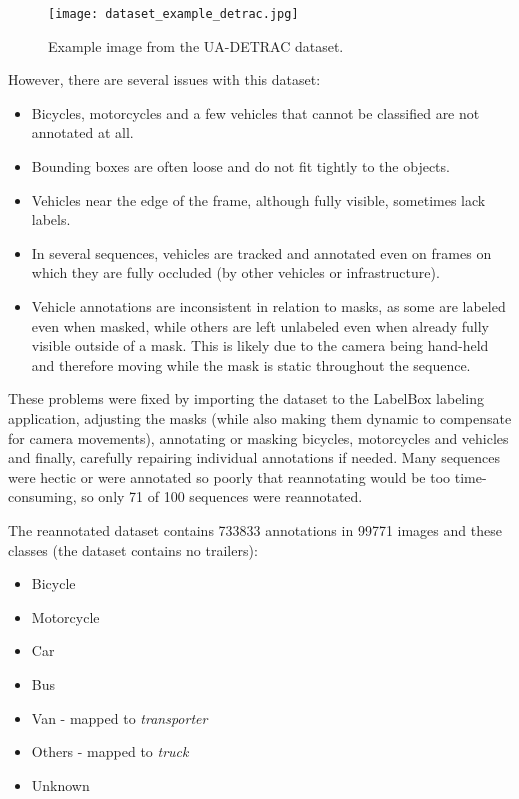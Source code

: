 \begin{figure}[h]
    \centering
    \texttt{[image: dataset\_example\_detrac.jpg]}
    \caption{Example image from the UA-DETRAC dataset.}
    \label{DetracDatasetExample}
\end{figure}

However, there are several issues with this dataset:
\begin{itemize}
    \item Bicycles, motorcycles and a few vehicles that cannot be classified are
    not annotated at all.
    \item Bounding boxes are often loose and do not fit tightly to the objects.
    \item Vehicles near the edge of the frame, although fully visible, sometimes
    lack labels.
    \item In several sequences, vehicles are tracked and annotated even on
    frames on which they are fully occluded (by other vehicles or
    infrastructure).
    \item Vehicle annotations are inconsistent in relation to masks, as some are
    labeled even when masked, while others are left unlabeled even when already
    fully visible outside of a mask. This is likely due to the camera being
    hand-held and therefore moving while the mask is static throughout the
    sequence.
\end{itemize}

These problems were fixed by importing the dataset to the LabelBox labeling
application, adjusting the masks (while also making them dynamic to compensate
for camera movements), annotating or masking bicycles, motorcycles and
 vehicles and finally, carefully repairing individual annotations if
needed. Many sequences were hectic or were annotated so poorly that reannotating
would be too time-consuming, so only 71 of 100 sequences were reannotated.

The reannotated dataset contains \num{733833} annotations in \num{99771}
images and these classes (the dataset contains no trailers):
\begin{itemize}
    \item Bicycle
    \item Motorcycle
    \item Car
    \item Bus
    \item Van - mapped to \textit{transporter}
    \item Others - mapped to \textit{truck}
    \item Unknown
\end{itemize}


